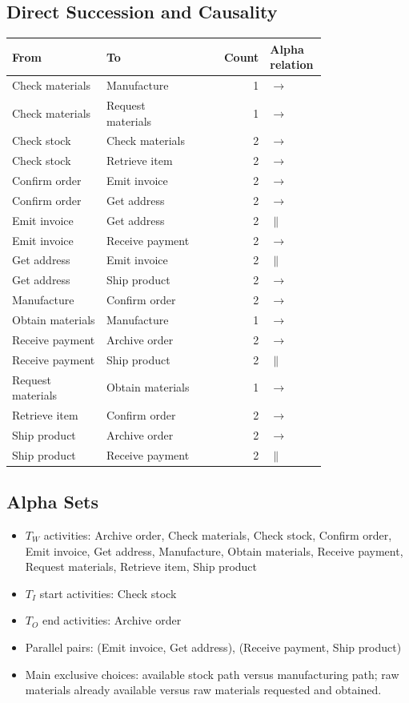 \subsection{Direct Succession and Causality}
\begin{longtable}{p{0.30\linewidth}p{0.30\linewidth}r p{0.18\linewidth}}
\toprule
From & To & Count & Alpha relation \\
\midrule
Check materials & Manufacture & 1 & $\rightarrow$ \\
Check materials & Request materials & 1 & $\rightarrow$ \\
Check stock & Check materials & 2 & $\rightarrow$ \\
Check stock & Retrieve item & 2 & $\rightarrow$ \\
Confirm order & Emit invoice & 2 & $\rightarrow$ \\
Confirm order & Get address & 2 & $\rightarrow$ \\
Emit invoice & Get address & 2 & $\parallel$ \\
Emit invoice & Receive payment & 2 & $\rightarrow$ \\
Get address & Emit invoice & 2 & $\parallel$ \\
Get address & Ship product & 2 & $\rightarrow$ \\
Manufacture & Confirm order & 2 & $\rightarrow$ \\
Obtain materials & Manufacture & 1 & $\rightarrow$ \\
Receive payment & Archive order & 2 & $\rightarrow$ \\
Receive payment & Ship product & 2 & $\parallel$ \\
Request materials & Obtain materials & 1 & $\rightarrow$ \\
Retrieve item & Confirm order & 2 & $\rightarrow$ \\
Ship product & Archive order & 2 & $\rightarrow$ \\
Ship product & Receive payment & 2 & $\parallel$ \\
\bottomrule
\end{longtable}
\subsection{Alpha Sets}
\begin{itemize}
\item $T_W$ activities: Archive order, Check materials, Check stock, Confirm order, Emit invoice, Get address, Manufacture, Obtain materials, Receive payment, Request materials, Retrieve item, Ship product
\item $T_I$ start activities: Check stock
\item $T_O$ end activities: Archive order
\item Parallel pairs: (Emit invoice, Get address), (Receive payment, Ship product)
\item Main exclusive choices: available stock path versus manufacturing path; raw materials already available versus raw materials requested and obtained.
\end{itemize}
